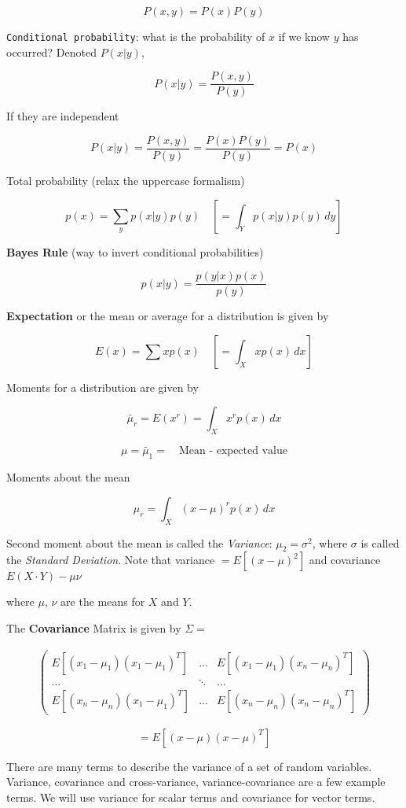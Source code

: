 \[P(x,y) = P(x)P(y)\]

\texttt{Conditional\ probability}: what is the probability of \(x\) if
we know \(y\) has occurred? Denoted \(P(x|y)\),

\[P(x|y) = \frac{P(x,y)}{P(y)}\]

If they are independent

\[P(x|y) = \frac{P(x,y)}{P(y)}=\frac{P(x)P(y)}{P(y)} = P(x)\]

Total probability (relax the uppercase formalism)

\[p(x) = \sum_{y} p(x|y)p(y)\quad \left[= \int_Y p(x|y)p(y)\, dy \right]\]

\textbf{Bayes Rule} (way to invert conditional probabilities)

\[p(x|y) = \frac{p(y|x)p(x)}{p(y)}\]

\textbf{Expectation} or the mean or average for a distribution is given
by

\[E(x) = \sum x p(x) \quad \left[ =\int_X x p(x)\, dx \right]\]

Moments for a distribution are given by

\[\tilde{\mu_r} = E(x^r) = \int_X x^rp(x)\, dx\]

\[\mu = \tilde{\mu_1} = \quad \mbox{Mean - expected value}\]

Moments about the mean

\[\mu_r = \int_X (x-\mu)^rp(x) \,dx\]

Second moment about the mean is called the \emph{Variance}: \(\mu_2 =
\sigma^2\), where \(\sigma\) is called the \emph{Standard Deviation}.
Note that variance \(=E[(x-\mu)^2]\) and covariance
\(E(X\cdot Y)-\mu\nu\)

where \(\mu\), \(\nu\) are the means for \(X\) and \(Y\).

The \textbf{Covariance} Matrix is given by \(\Sigma =\)

\[\begin{aligned}
\left( \begin{array}{cccc}E[(x_1-\mu_1)(x_1-\mu_1)^T]& \dots & E[(x_1-\mu_1)(x_n-\mu_n)^T]
 \\     \dots & \ddots & \dots
  \\ E[(x_n-\mu_n)(x_1-\mu_1)^T]  & \dots &
  E[(x_n-\mu_n)(x_n-\mu_n)^T]\end{array}\right)
\end{aligned}\]

\[= E[(x-\mu)(x-\mu)^T]\]

There are many terms to describe the variance of a set of random
variables. Variance, covariance and cross-variance, variance-covariance
are a few example terms. We will use variance for scalar terms and
covariance for vector terms.

